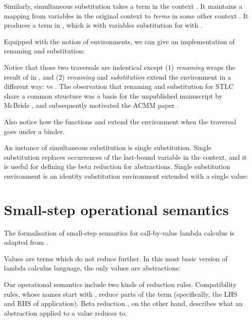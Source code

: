 \documentclass[bsc,frontabs,oneside,singlespacing,parskip,deptreport]{infthesis}
\theoremstyle{definition}
\theoremstyle{lemma}
\begin{document}
Similarly, simultaneous substitution takes a term  in the context
. It maintains a mapping  from variables in the original context
 to \textit{terms} in some other context . It produces a
term in , which is  with variables substitution for with .

Equipped with the notion of environments, we can give an
implementation of renaming and substitution:


Notice that those two traversals are indentical except (1)
\textit{renaming} wraps the result of  in , and (2)
\textit{renaming} and \textit{substitution} extend the environment in
a different way:  vs . The observation that renaming and substitution for STLC share a
common structure was a basis for the unpublished manuscript by McBride
\cite{mcbride2005type}, and subsequently motivated the ACMM paper
\cite{DBLP:conf/cpp/Allais0MM17}. 

Also notice how the functions  and  extend the
environment when the traversal goes under a binder.

An instance of simultaneous substitution is single
substitution. Single substitution replaces occurrences of the
last-bound variable in the context, and it is useful for defining the
beta reduction for abstractions. Single substitution environment is an
identity substitution environment extended with a single value:



\section{Small-step operational semantics}

The formalisation of small-step semantics for call-by-value lambda
calculus is adapted from \cite{DBLP:conf/sbmf/Wadler18}.

Values are terms which do not reduce further. In this most basic
version of lambda calculus language, the only values are abstractions:


Our operational semantics include two kinds of reduction rules. Compatibility rules, whose
names start with , reduce parts of the term (specifically, the LHS
and RHS of application). Beta reduction , on the other hand,
describes what an abstraction applied to a value reduces to.
\end{document}
